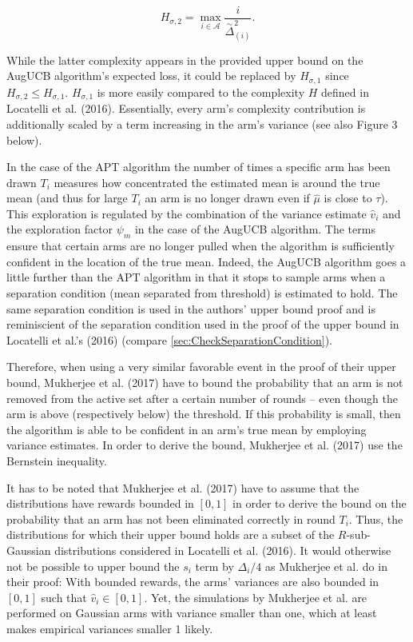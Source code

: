 \documentclass[11pt,]{article}
\begin{document}
\begin{equation*}
H_{\sigma,2} = \max_{i \in \mathcal{A}} \frac{i}{\stackrel{\sim}{\Delta}_{(i)}^2}.
\end{equation*}

While the latter complexity appears in the provided upper bound on the
AugUCB algorithm's expected loss, it could be replaced by
\(H_{\sigma, 1}\) since \(H_{\sigma, 2} \leq H_{\sigma,1}\).
\(H_{\sigma,1}\) is more easily compared to the complexity \(H\) defined
in Locatelli et al. (2016). Essentially, every arm's complexity
contribution is additionally scaled by a term increasing in the arm's
variance (see also Figure 3 below).

In the case of the APT algorithm the number of times a specific arm has
been drawn \(T_i\) measures how concentrated the estimated mean is
around the true mean (and thus for large \(T_i\) an arm is no longer
drawn even if \(\hat{\mu}\) is close to \(\tau\)). This exploration is
regulated by the combination of the variance estimate \(\hat{v}_i\) and
the exploration factor \(\psi_m\) in the case of the AugUCB algorithm.
The terms ensure that certain arms are no longer pulled when the
algorithm is sufficiently confident in the location of the true mean.
Indeed, the AugUCB algorithm goes a little further than the APT
algorithm in that it stops to sample arms when a separation condition
(mean separated from threshold) is estimated to hold. The same
separation condition is used in the authors' upper bound proof and is
reminiscient of the separation condition used in the proof of the upper
bound in Locatelli et al.'s (2016) (compare
\autoref{sec:CheckSeparationCondition}).

Therefore, when using a very similar favorable event in the proof of
their upper bound, Mukherjee et al. (2017) have to bound the probability
that an arm is not removed from the active set after a certain number of
rounds -- even though the arm is above (respectively below) the
threshold. If this probability is small, then the algorithm is able to
be confident in an arm's true mean by employing variance estimates. In
order to derive the bound, Mukherjee et al. (2017) use the Bernstein
inequality.

It has to be noted that Mukherjee et al. (2017) have to assume that the
distributions have rewards bounded in \([0,1]\) in order to derive the
bound on the probability that an arm has not been eliminated correctly
in round \(T_i\). Thus, the distributions for which their upper bound
holds are a subset of the \(R\)-sub-Gaussian distributions considered in
Locatelli et al. (2016). It would otherwise not be possible to upper
bound the \(s_i\) term by \(\Delta_i/4\) as Mukherjee et al. do in their
proof: With bounded rewards, the arms' variances are also bounded in
\([0,1]\) such that \(\hat{v}_i \in [0,1]\). Yet, the simulations by
Mukherjee et al. are performed on Gaussian arms with variance smaller
than one, which at least makes empirical variances smaller 1 likely.
\end{document}
